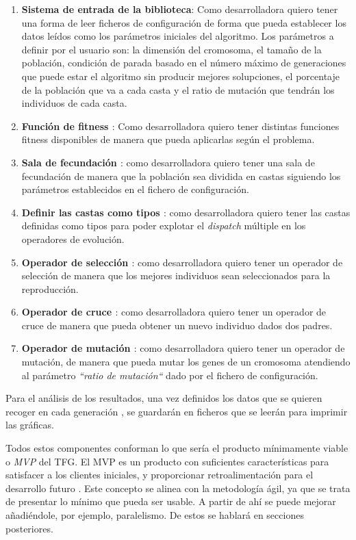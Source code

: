 \begin{enumerate}
    \item \textbf{Sistema de entrada de la biblioteca}: Como desarrolladora quiero tener una forma de leer ficheros de configuración de forma que pueda
    establecer los datos leídos como los parámetros iniciales del algoritmo. Los parámetros a definir por el usuario son: la dimensión del cromosoma, el tamaño de la población, 
    condición de parada basado en el número máximo de generaciones que puede estar el algoritmo sin producir mejores solupciones, el porcentaje de la población que va a cada casta y 
    el ratio de mutación que tendrán los individuos de cada casta.
    \item \textbf{Función de fitness \cite{project_repository_8}}: Como desarrolladora quiero tener distintas funciones fitness disponibles de manera que pueda aplicarlas según 
    el problema.
    \item \textbf{Sala de fecundación \cite{project_repository_17}}: como desarrolladora quiero tener una sala de fecundación de manera que la población sea dividida en castas siguiendo los parámetros establecidos
    en el fichero de configuración.
    \item \textbf{Definir las castas como tipos \cite{project_repository_21}}: como desarrolladora quiero tener las castas definidas como tipos para poder explotar el \emph{dispatch} múltiple en los operadores de evolución.
    \item \textbf{Operador de selección \cite{project_repository_18}}: como desarrolladora quiero tener un operador de selección de manera que los mejores individuos sean seleccionados para la reproducción.
    \item \textbf{Operador de cruce \cite{project_repository_19}}: como desarrolladora quiero tener un operador de cruce de manera que pueda obtener un nuevo individuo dados dos padres.
    \item \textbf{Operador de mutación \cite{project_repository_20}}: como desarrolladora quiero tener un operador de mutación, de manera que pueda mutar los genes de un cromosoma atendiendo al parámetro
    \emph{``ratio de mutación``} dado por el fichero de configuración. 
\end{enumerate}

Para el análisis de los resultados, una vez definidos los datos que se quieren recoger en cada generación \cite{pull_17}, 
se guardarán en ficheros que se leerán para imprimir las gráficas.

Todos estos componentes conforman lo que sería el producto mínimamente viable o \emph{MVP} del TFG. El MVP es un producto
con suficientes características para satisfacer a los clientes iniciales, y proporcionar retroalimentación para el desarrollo futuro \cite{mvp}. 
Este concepto se alinea con la metodología ágil, ya que se trata de presentar lo mínimo que pueda ser usable. A partir de ahí se puede mejorar 
añadiéndole, por ejemplo, paralelismo. De estos se hablará en secciones posteriores.
